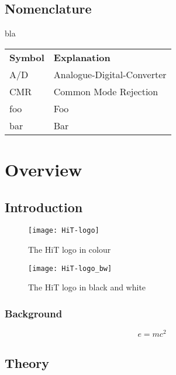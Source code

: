\documentclass[11pt,openright]{book} %
\begin{document}
\listoftables  %

\chapter*{Nomenclature}
\label{sec:summary}
bla

\begin{longtable}{ll}
  \textbf{Symbol} & \textbf{Explanation}\endhead\\
  A/D	& Analogue-Digital-Converter \\
  CMR	& Common Mode Rejection \\
  foo	& Foo \\
  bar 	& Bar
\end{longtable}


\mainmatter
\part{Overview}  %
\label{part:overview}
\chapter{Introduction}
\label{ch:intro}
\lipsum[4]
\begin{figure}[!ht]
  \centering
  \texttt{[image: HiT-logo]}
  \caption{The HiT logo in colour}
  \label{fig:hit-logo}
\end{figure}
\lipsum[4]
\begin{figure}[!ht]
  \centering
  \texttt{[image: HiT-logo\_bw]}
  \caption{The HiT logo in black and white}
  \label{fig:hit-logo-bw}
\end{figure}
\lipsum

\section{Background}
\label{sec:back}
\lipsum[4]
\begin{equation}
  e = m c^2
\end{equation}
\lipsum

\chapter{Theory}
\label{ch:theory}
\end{document}
